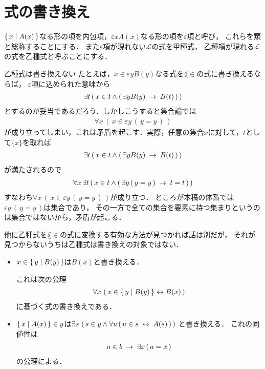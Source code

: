 \section{式の書き換え}
	$\left\{\, x \mid A(x)\, \right\}$なる形の項を内包項，$\varepsilon x A(x)$なる形の項を$\varepsilon$項と呼び，
	これらを類と総称することにする．
	また$\varepsilon$項が現れない$\mathcal{L}$の式を甲種式，
	乙種項が現れる$\mathcal{L}$の式を乙種式と呼ぶことにする．
	
	\begin{itembox}[l]{乙種式は書き換えない}
		たとえば，$x \in \varepsilon y B(y)$なる式を$\lang{\in}$の式に書き換えるならば，
		$\varepsilon$項に込められた意味から
		\begin{align}
			\exists t\, (\, x \in t \wedge 
			(\, \exists y B(y) \hspace{0.25em}\rightarrow\hspace{0.25em} B(t)\, )\, )
		\end{align}
		とするのが妥当であるだろう．しかしこうすると集合論では
		\begin{align}
			\forall x\, (\, x \in \varepsilon y\, (\, y=y\, )\, )
		\end{align}
		が成り立ってしまい，これは矛盾を起こす．実際，任意の集合$x$に対して，$t$として$\{x\}$を取れば
		\begin{align}
			\exists t\, (\, x \in t \wedge 
			(\, \exists y B(y) \hspace{0.25em}\rightarrow\hspace{0.25em} B(t)\, )\, )
		\end{align}
		が満たされるので
		\begin{align}
			\forall x\, \exists t\, (\, x \in t \wedge 
			(\, \exists y\, (\, y = y\, ) \hspace{0.25em}\rightarrow\hspace{0.25em} t = t\, )\, )
		\end{align}
		すなわち$\forall x\, (\, x \in \varepsilon y\, (\, y=y\, )\, )$が成り立つ．
		ところが本稿の体系では$\varepsilon y\, (\, y = y\, )$は集合であり，
		その一方で全ての集合を要素に持つ集まりというのは集合ではないから，矛盾が起こる．
		
		他に乙種式を$\lang{\in}$の式に変換する有効な方法が見つかれば話は別だが，
		それが見つからないうちは乙種式は書き換えの対象ではない．
	\end{itembox}
	
	\begin{itemize}
		\item $x \in \left\{\, y \mid B(y)\, \right\}$は$B(x)$と書き換える．
			
			これは次の公理
			\begin{align}
				\forall x\, \left(\, x \in \left\{\, y \mid B(y)\, \right\} \leftrightarrow B(x)\, \right)
			\end{align}
			に基づく式の書き換えである．
			
		\item $\left\{\, x \mid A(x)\, \right\} \in y$は$\exists s\, \left(\, s \in y \wedge 
			\forall u\, (\, u \in s \hspace{0.25em}\leftrightarrow\hspace{0.25em} A(s)\, )\, \right)$
			と書き換える．
			これの同値性は
			\begin{align}
				a \in b \hspace{0.25em}\rightarrow\hspace{0.25em} \exists x\, (\, a = x\, )
			\end{align}
			の公理による．
			
	\end{itemize}
	
